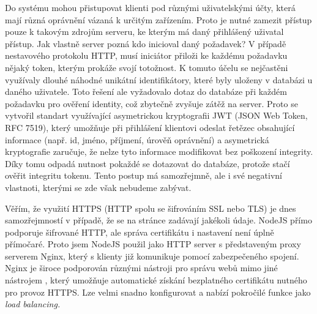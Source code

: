 Do systému mohou přistupovat klienti pod různými uživatelskými účty, která mají různá oprávnění vázaná k určitým zařízením. Proto je nutné zamezit přístup pouze k takovým zdrojům serveru, ke kterým má daný přihlášený uživatal přístup. Jak vlastně server pozná kdo inicioval daný požadavek? V případě nestavového protokolu HTTP, musí iniciátor přiloži ke každému požadavku nějaký token, kterým prokáže svojí totožnost. K tomuto účelu se nejčastěni využívaly dlouhé náhodné unikátní identifikátory, které byly uloženy v databázi u daného uživatele. Toto řešení ale vyžadovalo dotaz do databáze při každém požadavku pro ověření identity, což zbytečně zvyšuje zátěž na server. Proto se vytvořil standart využívající asymetrickou kryptografii JWT (JSON Web Token, RFC 7519), který umožňuje při přihlášení klientovi odeslat řetězec obsahující informace (např. id, jméno, příjmení, úrověň oprávnění) a asymetrická kryptografie zaručuje, že nelze tyto informace modifikovat bez poškození integrity. Díky tomu odpadá nutnost pokaždé se dotazovat do databáze, protože stačí ověřit integritu tokenu. Tento postup má samozřejmně, ale i své negativní vlastnoti, kterými se zde však nebudeme zabývat.

Věřím, že využití HTTPS (HTTP spolu se šifrováním SSL nebo TLS) je dnes samozřejmností v případě, že se na stránce zadávají jakékoli údaje. NodeJS přímo podporuje šifrované HTTP, ale správa certifikátu i nastavení není úplně přímočaré. Proto jsem NodeJS použil jako HTTP server s představeným proxy serverem Nginx, který s klienty již komunikuje pomocí zabezpečeného spojení. Nginx je široce podporován různými nástroji pro správu webů mimo jiné nástrojem , který umožňuje automatické získání bezplatného certifikátu nutného pro provoz HTTPS. Lze velmi snadno konfigurovat a nabízí pokročilé funkce jako \itshape{load balancing}.

